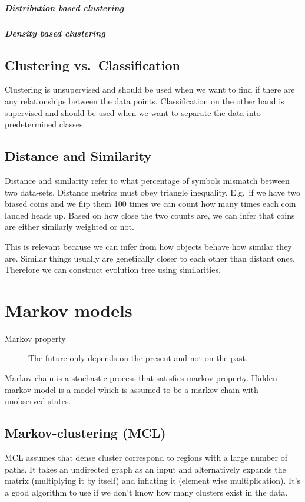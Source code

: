 \documentclass{report}
\begin{document}
\paragraph{Distribution based clustering} %
\paragraph{Density based clustering} %
\section{Clustering vs.\ Classification}
Clustering is unsupervised and should be used when we want to find if there are any relationships between the data points.
Classification on the other hand is supervised and should be used when we want to separate the data into predetermined classes.
\section{Distance and Similarity}
Distance and similarity refer to what percentage of symbols mismatch between two data-sets.
Distance metrics must obey triangle inequality.
E.g.\ if we have two biased coins and we flip them 100 times we can count how many times each coin landed heads up.
Based on how close the two counts are, we can infer that coins are either similarly weighted or not.

This is relevant because we can infer from how objects behave how similar they are.
Similar things usually are genetically closer to each other than distant ones.
Therefore we can construct evolution tree using similarities.

\chapter{Markov models}
\begin{description}
\item[Markov property] The future only depends on the present and not on the past.
\end{description}
Markov chain is a stochastic process that satisfies markov property.
Hidden markov model is a model which is assumed to be a markov chain with unobserved states.
\section{Markov-clustering (MCL)}
MCL assumes that dense cluster correspond to regions with a large number of paths.
It takes an undirected graph as an input and alternatively expands the matrix (multiplying it by itself) and inflating it (element wise multiplication).
It's a good algorithm to use if we don't know how many clusters exist in the data.
\end{document}
